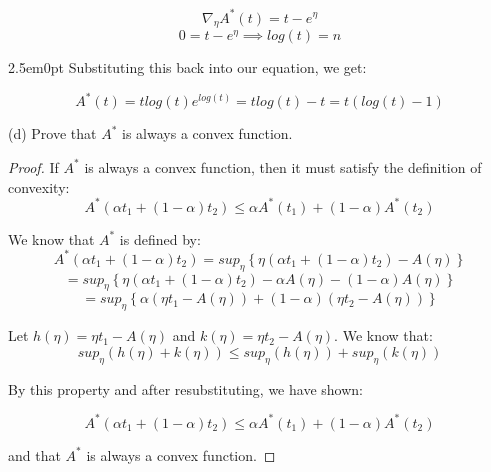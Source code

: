 \documentclass[11pt]{article}
\newenvironment{problem}[2][Problem]{\begin{trivlist}
\item[\hskip \labelsep {\bfseries #1}\hskip \labelsep {\bfseries #2.}]}{\end{trivlist}}
\begin{document}
\begin{problem}{2.2}
\[\nabla_{\eta} A^{*}(t) = t - e^{\eta} \]
\[0 = t - e^{\eta} \implies log(t) = n \]

\begin{adjustwidth}{2.5em}{0pt}
Substituting this back into our equation, we get:
\end{adjustwidth}
\[A^{*}(t) = tlog(t) e^{log(t)} = tlog(t) - t = t(log(t) - 1)\]

(d) Prove that $A^{*}$ is always a convex function.
\begin{proof}
If $A^{*}$ is always a convex function, then it must satisfy the definition of convexity: 
\[A^{*}(\alpha t_{1} + (1-\alpha)t_{2}) \leq \alpha A^{*}(t_{1}) + (1-\alpha)A^{*}(t_{2})\]

We know that $A^{*}$ is defined by:
\[A^{*}(\alpha t_{1} + (1-\alpha)t_{2}) = sup_{\eta}\left\{{\eta(\alpha t_{1} + (1-\alpha)t_{2}) - A(\eta)}\right\}\]
\[= sup_{\eta}\left\{{\eta(\alpha t_{1} + (1-\alpha)t_{2}) - \alpha A(\eta) - (1-\alpha)A(\eta)}\right\}\]
\[= sup_{\eta}\left\{{\alpha(\eta t_{1} - A(\eta)) + (1-\alpha)(\eta t_{2}-A(\eta))}\right\}\]

Let $h(\eta) = \eta t_{1} - A(\eta)$ and $k(\eta) = \eta t_{2}-A(\eta)$. We know that: 
\[sup_{\eta}(h(\eta) + k(\eta)) \leq sup_{\eta}(h(\eta)) + sup_{\eta}(k(\eta))\]

By this property and after resubstituting, we have shown: 

\[A^{*}(\alpha t_{1} + (1-\alpha)t_{2}) \leq \alpha A^{*}(t_{1}) + (1-\alpha)A^{*}(t_{2})\]

and that $A^{*}$ is always a convex function. 

\end{proof}

\end{problem}
\end{document}
